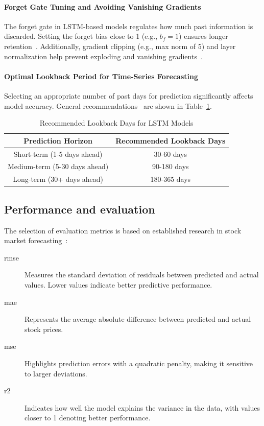 \paragraph{Forget Gate Tuning and Avoiding Vanishing Gradients}
The forget gate in LSTM-based models regulates how much past information is discarded. Setting the 
forget bias close to 1 (e.g., $ b_f = 1 $) ensures longer 
retention~\parencite{balasubramanian2023SystematicSurvey}. Additionally, gradient 
clipping (e.g., max norm of 5) and layer normalization help prevent exploding and vanishing 
gradients~\parencite{chang2024StockPrediction}.

\paragraph{Optimal Lookback Period for Time-Series Forecasting} Selecting an appropriate number
of past days for prediction significantly affects model accuracy. General 
recommendations~\parencite{shaban2024SMPDL, phuoc2024StockPrediction} are shown in Table~\ref{table:lookback}.

\begin{table}[H]
\centering
\caption{Recommended Lookback Days for LSTM Models}
\label{table:lookback}
\begin{tabular}{cc}
\hline
\textbf{Prediction Horizon} & \textbf{Recommended Lookback Days} \\ \hline\hline
Short-term (1-5 days ahead) & 30-60 days \\
Medium-term (5-30 days ahead) & 90-180 days \\
Long-term (30+ days ahead) & 180-365 days \\\hline
\end{tabular}
\end{table}

\subsection{Performance and evaluation}

The selection of evaluation metrics is based on established research in stock market 
forecasting~\parencite{agrawal2022StockPrediction, nabipour2020DeepLearning, guo2024LSTMStock}:

\begin{description}
\item[\acrfull{rmse}] Measures the standard deviation of residuals between predicted and 
                      actual values. Lower values indicate better predictive performance.
\item[\acrfull{mae}] Represents the average absolute difference between predicted and 
                     actual stock prices.
\item[\acrfull{mse}] Highlights prediction errors with a quadratic penalty, making it 
                     sensitive to larger deviations.
\item[\acrfull{r2}] Indicates how well the model explains the variance in the data, with values 
                    closer to 1 denoting better performance.
\end{description}

